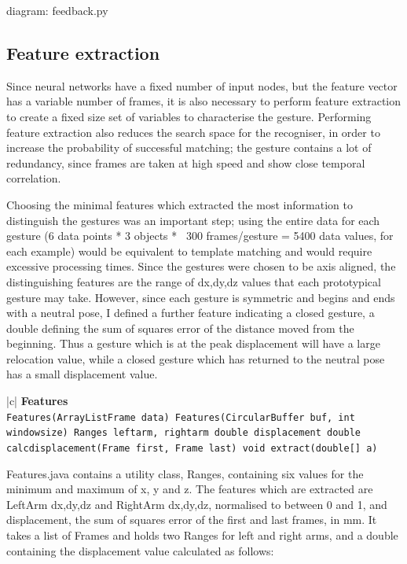 \documentclass[12pt,a4,notitlepage]{report}
\renewcommand{\_}{\texttt{\symbol{95}}}
\newcommand{\<}{\texttt{\symbol{60}}}
\renewcommand{\>}{\texttt{\symbol{62}}}
\newcommand{\class}[1]{\textbf{#1}}
\newcommand{\variable}[1]{\texttt{#1}}
\begin{document}
{{diagram: feedback.py}

\subsection{Feature extraction}

Since neural networks have a fixed number of input nodes, but the feature vector has a variable number of frames, it is also necessary to perform feature extraction to create a fixed size set of variables to characterise the gesture. Performing feature extraction also reduces the search space for the recogniser, in order to increase the probability of successful matching; the gesture contains a lot of redundancy, since frames are taken at high speed and show close temporal correlation.

Choosing the minimal features which extracted the most information to distinguish the gestures was an important step; using the entire data for each gesture (6 data points * 3 objects * ~300 frames/gesture = 5400 data values, for each example) would be equivalent to template matching and would require excessive processing times. Since the gestures were chosen to be axis aligned, the distinguishing features are the range of dx,dy,dz values that each prototypical gesture may take. However, since each gesture is symmetric and begins and ends with a neutral pose, I defined a further feature indicating a closed gesture, a double defining the sum of squares error of the distance moved from the beginning. Thus a gesture which is at the peak displacement will have a large relocation value, while a closed gesture which has returned to the neutral pose has a small displacement value.

\begin{tabular}{|c|} \hline 
\class{Features} \\ \hline
{}
{\variable{Features(ArrayList\<Frame\> data) \newline
Features(CircularBuffer buf, int windowsize) \newline
Ranges leftarm, rightarm \newline
double displacement \newline
double calc\_displacement(Frame first, Frame last) \newline
void extract(double[] a)
} } \\ \hline
\end{tabular}

Features.java contains a utility class, Ranges, containing six values for the minimum and maximum of x, y and z. The features which are extracted are LeftArm {dx,dy,dz} and RightArm {dx,dy,dz}, normalised to between 0 and 1, and displacement, the sum of squares error of the first and last frames, in mm. It takes a list of Frames and holds two Ranges for left and right arms, and a double containing the displacement value calculated as follows:

}
\end{document}
